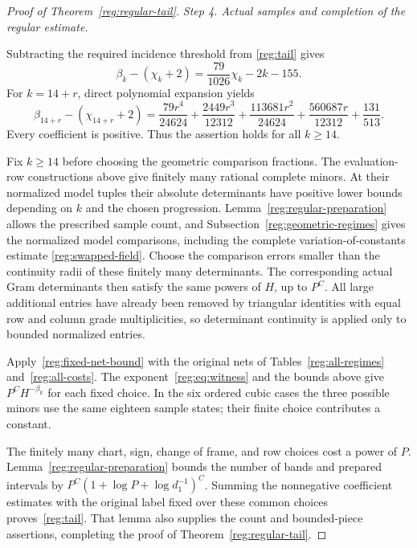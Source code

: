 \documentclass[11pt]{amsart}
\theoremstyle{definition}
\theoremstyle{remark}
\numberwithin{equation}{section}
\begin{document}
\begin{proof}[Proof of Theorem~\ref{reg:regular-tail}]
\par\medskip\noindent\textit{Step 4. Actual samples and completion of the regular estimate.}\par\nobreak\smallskip
Subtracting the required incidence threshold from \eqref{reg:tail} gives
\[
 \beta_k-(\chi_k+2)=\frac{79}{1026}\chi_k-2k-155.
\]
For $k=14+r$, direct polynomial expansion yields
\begin{equation}\label{reg:eq:positive}
 \beta_{14+r}-(\chi_{14+r}+2)
 =\frac{79r^4}{24624}+\frac{2449r^3}{12312}+\frac{113681r^2}{24624}+\frac{560687r}{12312}+\frac{131}{513}.
\end{equation}
Every coefficient is positive. Thus the assertion holds for all $k\ge14$.

Fix $k\ge14$ before choosing the geometric comparison fractions. The evaluation-row constructions above give finitely many rational complete minors. At their normalized model tuples their absolute determinants have positive lower bounds depending on $k$ and the chosen progression. Lemma~\ref{reg:regular-preparation} allows the prescribed sample count, and Subsection~\ref{reg:geometric-regimes} gives the normalized model comparisons, including the complete variation-of-constants estimate \eqref{reg:swapped-field}. Choose the comparison errors smaller than the continuity radii of these finitely many determinants. The corresponding actual Gram determinants then satisfy the same powers of $H$, up to $P^C$. All large additional entries have already been removed by triangular identities with equal row and column grade multiplicities, so determinant continuity is applied only to bounded normalized entries.

Apply~\eqref{reg:fixed-net-bound} with the original nets of Tables~\ref{reg:all-regimes} and~\ref{reg:all-costs}. The exponent~\eqref{reg:eq:witness} and the bounds above give $P^CH^{-\beta_k}$ for each fixed choice. In the six ordered cubic cases the three possible minors use the same eighteen sample states; their finite choice contributes a constant.

The finitely many chart, sign, change of frame, and row choices cost a power of $P$. Lemma~\ref{reg:regular-preparation} bounds the number of bands and prepared intervals by $P^C(1+\log P+\log d_1^{-1})^C$. Summing the nonnegative coefficient estimates with the original label fixed over these common choices proves~\eqref{reg:tail}. That lemma also supplies the count and bounded-piece assertions, completing the proof of Theorem~\ref{reg:regular-tail}.
\end{proof}
\end{document}
